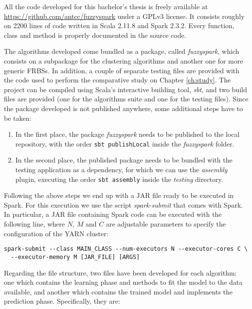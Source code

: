 %
%
%

All the code developed for this bachelor's thesis is freely available at \url{https://github.com/antcc/fuzzyspark} under a GPLv3 license. It consists roughly on 2200 lines of code written in Scala 2.11.8 and Spark 2.3.2. Every function, class and method is properly documented in the source code.

The algorithms developed come bundled as a package, called \textit{fuzzyspark}, which consists on a subpackage for the clustering algorithms and another one for more generic FRBSs. In addition, a couple of separate testing files are provided with the code used to perform the comparative study on Chapter \ref{ch:study}. The project can be compiled using Scala's interactive building tool, \textit{sbt}, and two build files are provided (one for the algorithms suite and one for the testing files). Since the package developed is not published anywhere, some additional steps have to be taken:

\begin{enumerate}[1.]
  \item In the first place, the package \textit{fuzzyspark} needs to be published to the local repository, with the order \verb|sbt publishLocal| inside the \textit{fuzzyspark} folder.
  \item In the second place, the published package needs to be bundled with the testing application as a dependency, for which we can use the \textit{assembly} plugin, executing the order \verb|sbt assembly| inside the \textit{testing} directory.
\end{enumerate}
Following the above steps we end up with a JAR file ready to be executed in Spark. For this execution we use the script \textit{spark-submit} that comes with Spark. In particular, a JAR file containing Spark code can be executed with the following line, where $N$, $M$ and $C$ are adjustable parameters to specify the configuration of the YARN cluster:

\begin{verbatim}
spark-submit --class MAIN_CLASS --num-executors N --executor-cores C \
  --executor-memory M [JAR_FILE] [ARGS]
\end{verbatim}

Regarding the file structure, two files have been developed for each algorithm: one which contains the learning phase and methods to fit the model to the data available, and another which contains the trained model and implements the prediction phase. Specifically, they are:

